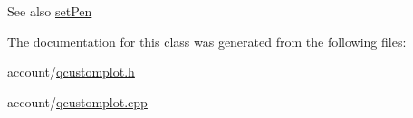 \begin{DoxySeeAlso}{\-See also}
\hyperlink{classQCPItemBracket_ab13001d9cc5d8f9e56ea15bdda682acb}{set\-Pen} 
\end{DoxySeeAlso}


\-The documentation for this class was generated from the following files\-:\begin{DoxyCompactItemize}
\item 
account/\hyperlink{qcustomplot_8h}{qcustomplot.\-h}\item 
account/\hyperlink{qcustomplot_8cpp}{qcustomplot.\-cpp}\end{DoxyCompactItemize}

